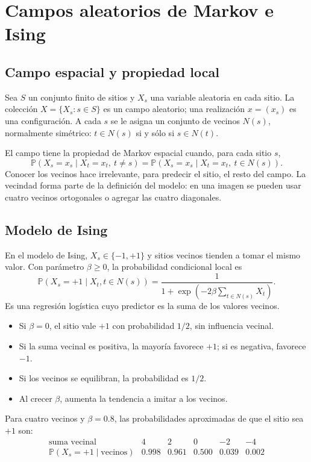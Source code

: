 \documentclass[11pt,oneside]{article}
\newcommand{\Prob}{\mathbb{P}}
\newcommand{\1}{\mathbf{1}}
\begin{document}
\section{Campos aleatorios de Markov e Ising}

\subsection{Campo espacial y propiedad local}

Sea $S$ un conjunto finito de sitios y $X_s$ una variable aleatoria en cada sitio. La colección $X=\{X_s:s\in S\}$ es un campo aleatorio; una realización $x=(x_s)$ es una configuración. A cada $s$ se le asigna un conjunto de vecinos $N(s)$, normalmente simétrico: $t\in N(s)$ si y sólo si $s\in N(t)$.

El campo tiene la propiedad de Markov espacial cuando, para cada sitio $s$,
\[
\Prob(X_s=x_s\mid X_t=x_t,\ t\ne s)
 =\Prob(X_s=x_s\mid X_t=x_t,\ t\in N(s)).
\]
Conocer los vecinos hace irrelevante, para predecir el sitio, el resto del campo. La vecindad forma parte de la definición del modelo: en una imagen se pueden usar cuatro vecinos ortogonales o agregar las cuatro diagonales.

\subsection{Modelo de Ising}

En el modelo de Ising, $X_s\in\{-1,+1\}$ y sitios vecinos tienden a tomar el mismo valor. Con parámetro $\beta\geq0$, la probabilidad condicional local es
\[
\boxed{\Prob(X_s=+1\mid X_t,t\in N(s))
 =\frac{1}{1+\exp\left(-2\beta\sum_{t\in N(s)}X_t\right)}.}
\]
Es una regresión logística cuyo predictor es la suma de los valores vecinos.
\begin{itemize}
  \item Si $\beta=0$, el sitio vale $+1$ con probabilidad $1/2$, sin influencia vecinal.
  \item Si la suma vecinal es positiva, la mayoría favorece $+1$; si es negativa, favorece $-1$.
  \item Si los vecinos se equilibran, la probabilidad es $1/2$.
  \item Al crecer $\beta$, aumenta la tendencia a imitar a los vecinos.
\end{itemize}
Para cuatro vecinos y $\beta=0.8$, las probabilidades aproximadas de que el sitio sea $+1$ son:
\[
\begin{array}{c|ccccc}
\text{suma vecinal} & 4 & 2 & 0 & -2 & -4\\
\hline
\Prob(X_s=+1\mid\text{vecinos}) & 0.998 & 0.961 & 0.500 & 0.039 & 0.002
\end{array}
\]
\end{document}

